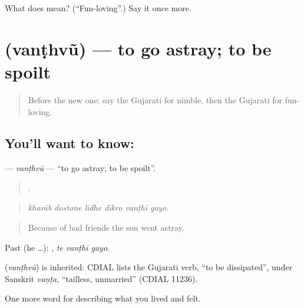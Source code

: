 \begin{tcolorbox}[breakable,colback=teal!4,colframe=teal!35!black,title={Before you move on}]
What does  mean? (\textquotedblleft{}Fun-loving\textquotedblright{}.) Say it once more.
\end{tcolorbox}
\section[\texorpdfstring{\gu{વંઠવું} (vanṭhvũ)}{વંઠવું (vanṭhvũ)}]{ (vanṭhvũ) — to go astray; to be spoilt}

\label{lesson:GU-C462-vanthvu}



\begin{quote}
Before the new one: say the Gujarati for nimble, then the Gujarati for fun-loving.
\end{quote}

\subsection*{You'll want to know: }
\textbf{} — \emph{vanṭhvũ} — \textquotedblleft{}to go astray; to be spoilt\textquotedblright{}.

\begin{quote}
     .
\end{quote}

\begin{quote}
\emph{kharāb dostone līdhe dīkro vanṭhī gayo.}
\end{quote}

\begin{quote}
Because of bad friends the son went astray.
\end{quote}

Past (he …):   , \emph{te vanṭhī gayo}.

\begin{cousinweb}
\textbf{} (\emph{vanṭhvũ}) is inherited: CDIAL lists the Gujarati verb, \textquotedblleft{}to be dissipated\textquotedblright{}, under Sanskrit \emph{vaṇṭa}, \textquotedblleft{}tailless, unmarried\textquotedblright{} (CDIAL 11236).
\end{cousinweb}

\begin{grammarlens}[title={What you've built}]
One more word for describing what you lived and felt.
\end{grammarlens}

